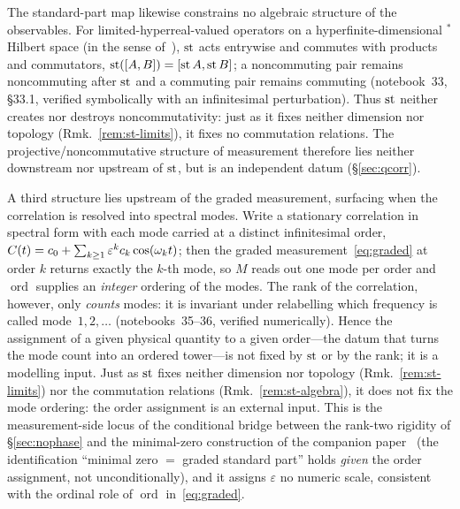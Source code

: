 \documentclass[11pt]{article}
\begin{document}
\begin{remark}\label{rem:st-algebra}
The standard-part map likewise constrains no algebraic structure of the observables. For
limited-hyperreal-valued operators on a hyperfinite-dimensional ${}^{*}$Hilbert space (in the
sense of~\cite{albeverio,yamashita}), $\operatorname{st}$ acts entrywise and commutes with products and
commutators, $\operatorname{st}([A,B])=[\operatorname{st} A,\operatorname{st} B]$; a noncommuting pair remains noncommuting after $\operatorname{st}$
and a commuting pair remains commuting (notebook~33, \S33.1, verified symbolically with an
infinitesimal perturbation). Thus $\operatorname{st}$ neither creates nor destroys noncommutativity: just as
it fixes neither dimension nor topology (Rmk.~\ref{rem:st-limits}), it fixes no commutation
relations. The projective/noncommutative structure of measurement therefore lies neither
downstream nor upstream of $\operatorname{st}$, but is an independent datum (\S\ref{sec:qcorr}).
\end{remark}

\begin{remark}\label{rem:st-ordering}
A third structure lies upstream of the graded measurement, surfacing when the correlation
is resolved into spectral modes. Write a stationary correlation in spectral form with each
mode carried at a distinct infinitesimal order,
$C(t)=c_0+\sum_{k\ge1}\varepsilon^{k}c_k\cos(\omega_k t)$; then the graded
measurement~\eqref{eq:graded} at order $k$ returns exactly the $k$-th mode, so $M$ reads out
one mode per order and $\operatorname{ord}$ supplies an \emph{integer} ordering of the modes.
The rank of the correlation, however, only \emph{counts} modes: it is invariant under
relabelling which frequency is called mode~$1,2,\dots$ (notebooks~35--36, verified
numerically). Hence the assignment of a given physical quantity to a given order---the datum
that turns the mode count into an ordered tower---is not fixed by $\operatorname{st}$ or by the rank; it is
a modelling input. Just as $\operatorname{st}$ fixes neither dimension nor topology
(Rmk.~\ref{rem:st-limits}) nor the commutation relations (Rmk.~\ref{rem:st-algebra}), it does
not fix the mode ordering: the order assignment is an external input. This is the
measurement-side locus of the conditional bridge between the rank-two rigidity of
\S\ref{sec:nophase} and the minimal-zero construction of the companion
paper~\cite{rank2paper} (the identification ``minimal zero $=$ graded standard part'' holds
\emph{given} the order assignment, not unconditionally), and it assigns $\varepsilon$ no
numeric scale, consistent with the ordinal role of $\operatorname{ord}$ in~\eqref{eq:graded}.
\end{remark}
\end{document}
